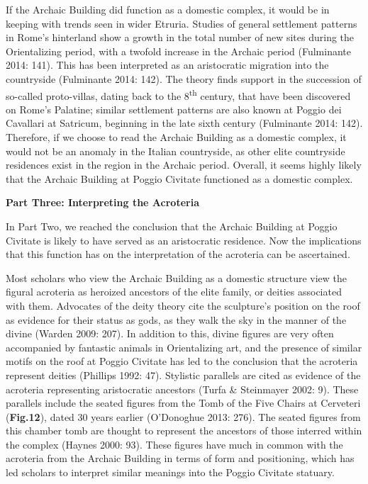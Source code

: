 If the Archaic Building did function as a domestic complex, it would be
in keeping with trends seen in wider Etruria. Studies of general
settlement patterns in Rome's hinterland show a growth in the total
number of new sites during the Orientalizing period, with a twofold
increase in the Archaic period (Fulminante 2014: 141). This has been
interpreted as an aristocratic migration into the countryside
(Fulminante 2014: 142). The theory finds support in the succession of
so-called proto-villas, dating back to the 8\textsuperscript{th}
century, that have been discovered on Rome's Palatine; similar
settlement patterns are also known at Poggio dei Cavallari at Satricum,
beginning in the late sixth century (Fulminante 2014: 142). Therefore,
if we choose to read the Archaic Building as a domestic complex, it
would not be an anomaly in the Italian countryside, as other elite
countryside residences exist in the region in the Archaic period.
Overall, it seems highly likely that the Archaic Building at Poggio
Civitate functioned as a domestic complex.

\textbf{Part Three: Interpreting the Acroteria}

In Part Two, we reached the conclusion that the Archaic Building at
Poggio Civitate is likely to have served as an aristocratic residence.
Now the implications that this function has on the interpretation of the
acroteria can be ascertained.

Most scholars who view the Archaic Building as a domestic structure view
the figural acroteria as heroized ancestors of the elite family, or
deities associated with them. Advocates of the deity theory cite the
sculpture's position on the roof as evidence for their status as gods,
as they walk the sky in the manner of the divine (Warden 2009: 207). In
addition to this, divine figures are very often accompanied by fantastic
animals in Orientalizing art, and the presence of similar motifs on the
roof at Poggio Civitate has led to the conclusion that the acroteria
represent deities (Phillips 1992: 47). Stylistic parallels are cited as
evidence of the acroteria representing aristocratic ancestors (Turfa \&
Steinmayer 2002: 9). These parallels include the seated figures from the
Tomb of the Five Chairs at Cerveteri (\textbf{Fig.12}), dated 30 years
earlier (O'Donoghue 2013: 276). The seated figures from this chamber
tomb are thought to represent the ancestors of those interred within the
complex (Haynes 2000: 93). These figures have much in common with the
acroteria from the Archaic Building in terms of form and positioning,
which has led scholars to interpret similar meanings into the Poggio
Civitate statuary.


